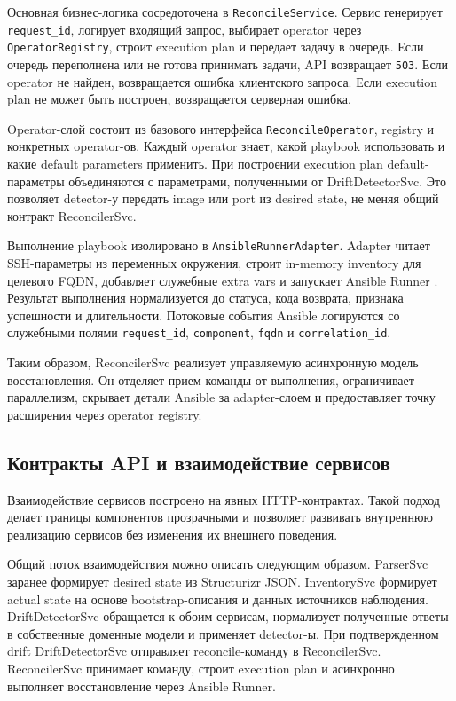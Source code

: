 Основная бизнес-логика сосредоточена в \texttt{ReconcileService}. Сервис генерирует \texttt{request\_id}, логирует входящий запрос, выбирает operator через \texttt{OperatorRegistry}, строит execution plan и передает задачу в очередь. Если очередь переполнена или не готова принимать задачи, API возвращает \texttt{503}. Если operator не найден, возвращается ошибка клиентского запроса. Если execution plan не может быть построен, возвращается серверная ошибка.

Operator-слой состоит из базового интерфейса \texttt{ReconcileOperator}, registry и конкретных operator-ов. Каждый operator знает, какой playbook использовать и какие default parameters применить. При построении execution plan default-параметры объединяются с параметрами, полученными от DriftDetectorSvc. Это позволяет detector-у передать image или port из desired state, не меняя общий контракт ReconcilerSvc.

Выполнение playbook изолировано в \texttt{AnsibleRunnerAdapter}. Adapter читает SSH-параметры из переменных окружения, строит in-memory inventory для целевого FQDN, добавляет служебные extra vars и запускает Ansible Runner \cite{ansible_docs}. Результат выполнения нормализуется до статуса, кода возврата, признака успешности и длительности. Потоковые события Ansible логируются со служебными полями \texttt{request\_id}, \texttt{component}, \texttt{fqdn} и \texttt{correlation\_id}.

Таким образом, ReconcilerSvc реализует управляемую асинхронную модель восстановления. Он отделяет прием команды от выполнения, ограничивает параллелизм, скрывает детали Ansible за adapter-слоем и предоставляет точку расширения через operator registry.

\subsection{Контракты API и взаимодействие сервисов}

Взаимодействие сервисов построено на явных HTTP-контрактах. Такой подход делает границы компонентов прозрачными и позволяет развивать внутреннюю реализацию сервисов без изменения их внешнего поведения.

Общий поток взаимодействия можно описать следующим образом. ParserSvc заранее формирует desired state из Structurizr JSON. InventorySvc формирует actual state на основе bootstrap-описания и данных источников наблюдения. DriftDetectorSvc обращается к обоим сервисам, нормализует полученные ответы в собственные доменные модели и применяет detector-ы. При подтвержденном drift DriftDetectorSvc отправляет reconcile-команду в ReconcilerSvc. ReconcilerSvc принимает команду, строит execution plan и асинхронно выполняет восстановление через Ansible Runner.

